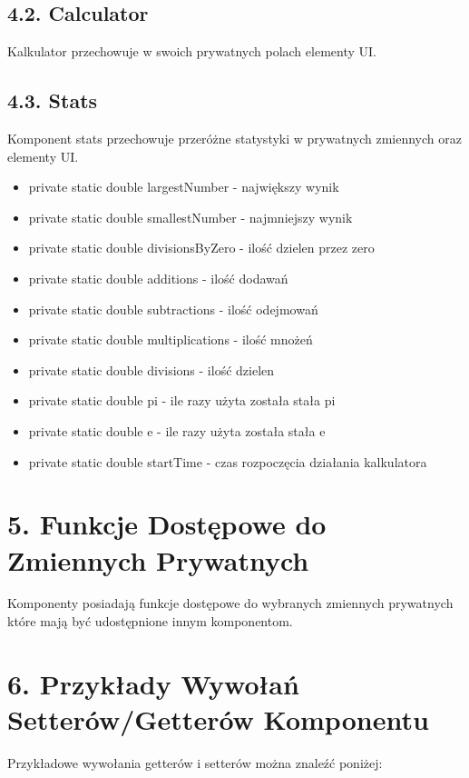 \documentclass{article}
\begin{document}
\subsection*{4.2. Calculator}

Kalkulator przechowuje w swoich prywatnych polach elementy UI.
    
\subsection*{4.3. Stats}

Komponent stats przechowuje przeróżne statystyki w prywatnych zmiennych oraz
elementy UI.

\begin{itemize}
    \item private static double largestNumber - największy wynik
    \item private static double smallestNumber - najmniejszy wynik
    \item private static double divisionsByZero - ilość dzielen przez zero
    \item private static double additions - ilość dodawań
    \item private static double subtractions - ilość odejmowań
    \item private static double multiplications - ilość mnożeń
    \item private static double divisions - ilość dzielen
    \item private static double pi - ile razy użyta została stała pi
    \item private static double e - ile razy użyta została stała e
    \item private static double startTime - czas rozpoczęcia działania kalkulatora
\end{itemize}

\section*{5. Funkcje Dostępowe do Zmiennych Prywatnych}

Komponenty posiadają funkcje dostępowe do wybranych zmiennych prywatnych które mają być udostępnione innym komponentom.

\section*{6. Przykłady Wywołań Setterów/Getterów Komponentu}

Przykładowe wywołania getterów i setterów można znaleźć poniżej:
\end{document}
